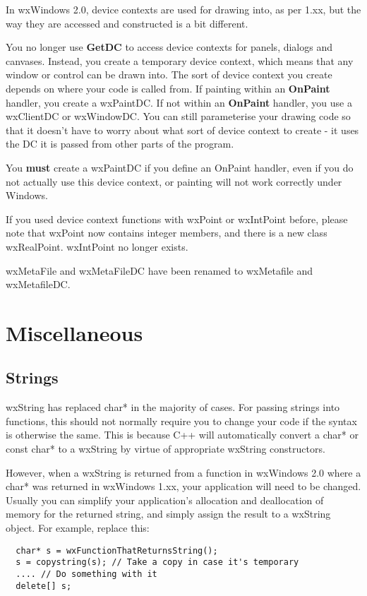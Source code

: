 In wxWindows 2.0, device contexts are used for drawing into, as per 1.xx, but the way
they are accessed and constructed is a bit different.

You no longer use {\bf GetDC} to access device contexts for panels, dialogs and canvases.
Instead, you create a temporary device context, which means that any window or control can be drawn
into. The sort of device context you create depends on where your code is called from. If
painting within an {\bf OnPaint} handler, you create a wxPaintDC. If not within an {\bf OnPaint} handler,
you use a wxClientDC or wxWindowDC. You can still parameterise your drawing code so that it
doesn't have to worry about what sort of device context to create - it uses the DC it is passed
from other parts of the program.

You {\bf must } create a wxPaintDC if you define an OnPaint handler, even if you do not
actually use this device context, or painting will not work correctly under Windows.

If you used device context functions with wxPoint or wxIntPoint before, please note
that wxPoint now contains integer members, and there is a new class wxRealPoint. wxIntPoint
no longer exists.

wxMetaFile and wxMetaFileDC have been renamed to wxMetafile and wxMetafileDC.

\section{Miscellaneous}

\subsection{Strings}

wxString has replaced char* in the majority of cases. For passing strings into functions,
this should not normally require you to change your code if the syntax is otherwise the
same. This is because C++ will automatically convert a char* or const char* to a wxString by virtue
of appropriate wxString constructors.

However, when a wxString is returned from a function in wxWindows 2.0 where a char* was
returned in wxWindows 1.xx, your application will need to be changed. Usually you can
simplify your application's allocation and deallocation of memory for the returned string,
and simply assign the result to a wxString object. For example, replace this:

{\small\begin{verbatim}
  char* s = wxFunctionThatReturnsString();
  s = copystring(s); // Take a copy in case it's temporary
  .... // Do something with it
  delete[] s;
\end{verbatim}
}

